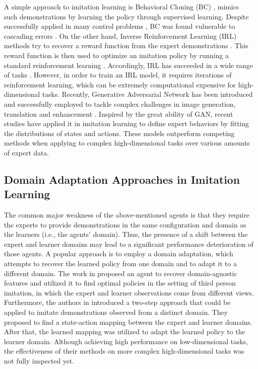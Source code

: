 A simple approach to imitation learning is Behavioral Cloning (BC) \cite{pomerleau1989alvinn}, mimics such demonstrations by learning the policy through supervised learning.
Despite successfully applied in many control problems \cite{pomerleau1989alvinn,duan2017one,rahmatizadeh2018vision}, BC was found vulnerable to cascading errors \cite{ross2011reduction}.
On the other hand, Inverse Reinforcement Learning (IRL) \cite{ng2000algorithms} methods try to recover a reward function from the expert demonstrations \cite{ng2000algorithms,abbeel2004apprenticeship,levine2011nonlinear,ziebart2008maximum}.
This reward function is then used to optimize an imitation policy by running a standard reinforcement learning \cite{finn2016guided,kalakrishnan2013learning}.
Accordingly, IRL has succeeded in a wide range of tasks \cite{arora2021survey,naumann2020analyzing,bing2020energy,zelinsky2020predicting}.
However, in order to train an IRL model, it requires iterations of reinforcement learning, which can be extremely computational expensive for high-dimensional tasks.
Recently, Generative Adversarial Network \cite{GAN_Original} has been introduced and successfully employed to tackle complex challenges in image generation, translation and enhancement \cite{GAN_CAPTCHA,GAN_MRI,GAN_ImageCompression,GAN_ImageTranslation}.
Inspired by the great ability of GAN,
recent studies \cite{IL_Model_GAIL,pmlr-v70-baram17a,behbahani2019learning,10.5555/3294996.3295138,zhang2020cgail,chi2020collaborative,zhou2020modeling}
have applied
it in imitation learning
to define expert behaviors by fitting the distributions of states and actions.
These models outperform competing methods when applying to complex high-dimensional tasks over various amounts of expert data.

\subsection{Domain Adaptation Approaches in Imitation Learning}

The common major weakness of the above-mentioned agents is that they require the experts to provide demonstrations in the same
configuration and
domain as the learners (i.e., the agents' domain).
Thus, the presence of a shift between the expert and learner domains may lead to a significant performance deterioration of those agents.
A popular approach is to employ a domain adaptation, which attempts to recover the learned policy from one domain and to adapt it to a different domain.
The work in \cite{DAIL_Model_ThirdPerson} proposed an agent to recover domain-agnostic features and utilized it to find optimal policies in the setting of third person imitation, in which the expert and learner observations come from different views.
Furthermore, the authors in \cite{DAIL_Model_DAIL} introduced a two-step approach that could be applied to imitate demonstrations observed from a distinct domain.
They proposed to find a state-action mapping between the expert and learner domains.
After that, the learned mapping was utilized to adapt the learned policy to the learner domain.
Although achieving high performance on low-dimensional tasks, the effectiveness of their methods on more complex high-dimensional tasks was not fully inspected yet.

